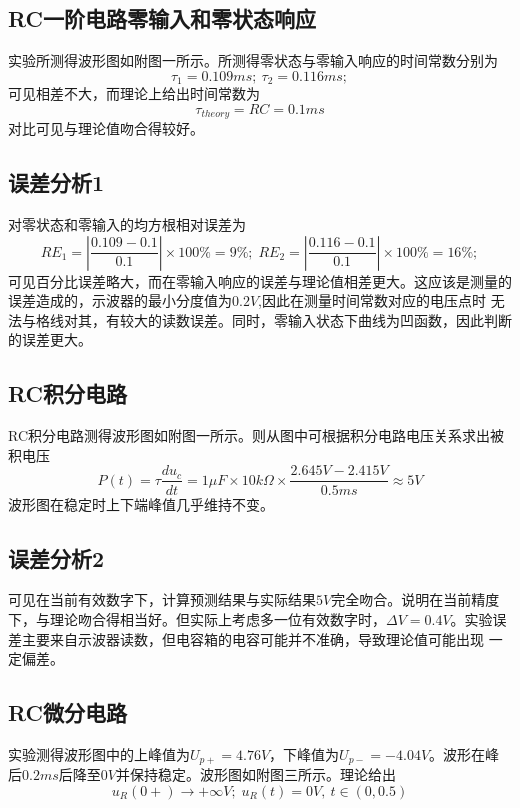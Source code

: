 \documentclass[a4paper,11pt,UTF8]{ctexart}
\begin{document}
\subsection{RC一阶电路零输入和零状态响应}
实验所测得波形图如附图一所示。所测得零状态与零输入响应的时间常数分别为
\begin{equation}
  \tau_1=0.109ms;~\tau_2=0.116ms;
\label{eqa:timeConstant}
\end{equation}
可见相差不大，而理论上给出时间常数为
\begin{equation}
  \tau_{theory}=RC=0.1ms
\end{equation}
对比可见与理论值吻合得较好。
\subsection{误差分析1}
对零状态和零输入的均方根相对误差为
\begin{equation}
  RE_1=\left|\frac{0.109-0.1}{0.1}\right|\times100\%=9\%;\;
  RE_2=\left|\frac{0.116-0.1}{0.1}\right|\times100\%=16\%;
\end{equation}
可见百分比误差略大，而在零输入响应的误差与理论值相差更大。这应该是测量的误差造成的，示波器的最小分度值为$0.2V$,因此在测量时间常数对应的电压点时
无法与格线对其，有较大的读数误差。同时，零输入状态下曲线为凹函数，因此判断的误差更大。
\subsection{RC积分电路}
RC积分电路测得波形图如附图一所示。则从图中可根据积分电路电压关系求出被积电压
\begin{equation}
  P(t)=\tau \frac{d u_{c}}{dt}=1\mu F\times10k\Omega\times\frac{2.645V-2.415V}{0.5ms}\approx5V
\end{equation}
波形图在稳定时上下端峰值几乎维持不变。
\subsection{误差分析2}
可见在当前有效数字下，计算预测结果与实际结果$5V$完全吻合。说明在当前精度下，与理论吻合得相当好。但实际上考虑多一位有效数字时，$\Delta V=0.4V$。实验误差主要来自示波器读数，但电容箱的电容可能并不准确，导致理论值可能出现
一定偏差。
\subsection{RC微分电路}
实验测得波形图中的上峰值为$U_{p+}=4.76V$，下峰值为$U_{p-}=-4.04V$。波形在峰后$0.2ms$后降至$0V$并保持稳定。波形图如附图三所示。理论给出
\begin{equation}
  u_R(0+)\rightarrow+\infty V;\; u_R(t)=0V,~t\in(0,0.5)
\end{equation}
\end{document}

